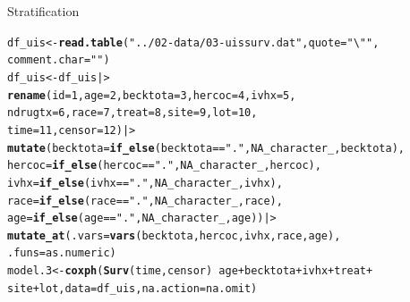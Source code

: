 \documentclass[12pt,english,pdf,xcolor=dvipsnames,aspectratio=169,handout]{beamer}\usepackage[]{graphicx}\usepackage[]{xcolor}
\makeatletter
\newcommand{\hlnum}[1]{\textcolor[rgb]{0.686,0.059,0.569}{#1}}%
\newcommand{\hlstr}[1]{\textcolor[rgb]{0.192,0.494,0.8}{#1}}%
\newcommand{\hlopt}[1]{\textcolor[rgb]{0,0,0}{#1}}%
\newcommand{\hlstd}[1]{\textcolor[rgb]{0.345,0.345,0.345}{#1}}%
\newcommand{\hlkwb}[1]{\textcolor[rgb]{0.69,0.353,0.396}{#1}}%
\newcommand{\hlkwc}[1]{\textcolor[rgb]{0.333,0.667,0.333}{#1}}%
\newcommand{\hlkwd}[1]{\textcolor[rgb]{0.737,0.353,0.396}{\textbf{#1}}}%
\newenvironment{kframe}{%
 \def\at@end@of@kframe{}%
 \ifinner\ifhmode%
  \def\at@end@of@kframe{\end{minipage}}%
  \begin{minipage}{\columnwidth}%
 \fi\fi%
 \def\FrameCommand##1{\hskip\@totalleftmargin \hskip-\fboxsep
 \colorbox{shadecolor}{##1}\hskip-\fboxsep
     \hskip-\linewidth \hskip-\@totalleftmargin \hskip\columnwidth}%
 \MakeFramed {\advance\hsize-\width
   \@totalleftmargin\z@ \linewidth\hsize
   \@setminipage}}%
 {\par\unskip\endMakeFramed%
 \at@end@of@kframe}
\newenvironment{knitrout}{}{} %
\makeatother
\begin{document}
\begin{frame}[fragile]{Stratification}
\begin{knitrout}\scriptsize
{}\color{fgcolor}\begin{kframe}
\begin{alltt}
\hlstd{df_uis} \hlkwb{<-} \hlkwd{read.table}\hlstd{(}\hlstr{"../02-data/03-uissurv.dat"}\hlstd{,} \hlkwc{quote} \hlstd{=} \hlstr{"\textbackslash{}""}\hlstd{,}
                     \hlkwc{comment.char} \hlstd{=} \hlstr{""}\hlstd{)}
\hlstd{df_uis} \hlkwb{<-} \hlstd{df_uis |>}
  \hlkwd{rename}\hlstd{(}\hlkwc{id} \hlstd{=} \hlnum{1}\hlstd{,} \hlkwc{age} \hlstd{=} \hlnum{2}\hlstd{,} \hlkwc{becktota} \hlstd{=} \hlnum{3}\hlstd{,} \hlkwc{hercoc} \hlstd{=} \hlnum{4}\hlstd{,} \hlkwc{ivhx} \hlstd{=} \hlnum{5}\hlstd{,}
         \hlkwc{ndrugtx} \hlstd{=} \hlnum{6}\hlstd{,} \hlkwc{race} \hlstd{=} \hlnum{7}\hlstd{,} \hlkwc{treat} \hlstd{=} \hlnum{8}\hlstd{,} \hlkwc{site} \hlstd{=} \hlnum{9}\hlstd{,} \hlkwc{lot} \hlstd{=} \hlnum{10}\hlstd{,}
         \hlkwc{time} \hlstd{=} \hlnum{11}\hlstd{,} \hlkwc{censor} \hlstd{=} \hlnum{12}\hlstd{) |>}
  \hlkwd{mutate}\hlstd{(}\hlkwc{becktota} \hlstd{=} \hlkwd{if_else}\hlstd{(becktota} \hlopt{==} \hlstr{"."}\hlstd{,} \hlnum{NA_character_}\hlstd{, becktota),}
         \hlkwc{hercoc} \hlstd{=} \hlkwd{if_else}\hlstd{(hercoc} \hlopt{==} \hlstr{"."}\hlstd{,} \hlnum{NA_character_}\hlstd{, hercoc),}
         \hlkwc{ivhx} \hlstd{=} \hlkwd{if_else}\hlstd{(ivhx} \hlopt{==} \hlstr{"."}\hlstd{,} \hlnum{NA_character_}\hlstd{, ivhx),}
         \hlkwc{race} \hlstd{=} \hlkwd{if_else}\hlstd{(race} \hlopt{==} \hlstr{"."}\hlstd{,} \hlnum{NA_character_}\hlstd{, race),}
         \hlkwc{age} \hlstd{=} \hlkwd{if_else}\hlstd{(age} \hlopt{==} \hlstr{"."}\hlstd{,} \hlnum{NA_character_}\hlstd{, age)) |>}
  \hlkwd{mutate_at}\hlstd{(}\hlkwc{.vars} \hlstd{=} \hlkwd{vars}\hlstd{(becktota, hercoc, ivhx, race, age),}
            \hlkwc{.funs} \hlstd{= as.numeric)}
\hlstd{model.3} \hlkwb{<-} \hlkwd{coxph}\hlstd{(}\hlkwd{Surv}\hlstd{(time, censor)} \hlopt{~} \hlstd{age} \hlopt{+} \hlstd{becktota} \hlopt{+} \hlstd{ivhx} \hlopt{+} \hlstd{treat} \hlopt{+}
                   \hlstd{site} \hlopt{+} \hlstd{lot,} \hlkwc{data} \hlstd{= df_uis,} \hlkwc{na.action} \hlstd{= na.omit)}
\end{alltt}
\end{kframe}
\end{knitrout}

\end{frame}
\end{document}
